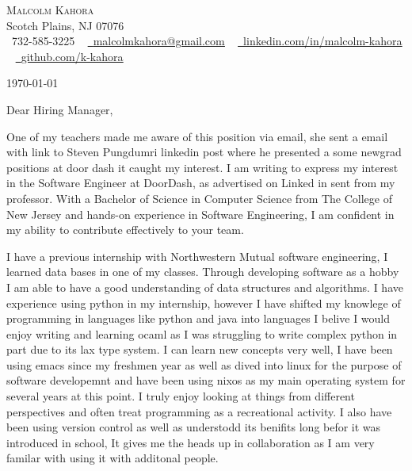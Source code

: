 \documentclass[letterpaper,11pt]{article}
\begin{document}
\begin{center}
    {\Huge \scshape Malcolm Kahora} \\ \vspace{1pt}
    Scotch Plains, NJ 07076 \\ \vspace{1pt}
    \small \raisebox{-0.1\height}\faPhone\ 732-585-3225 ~ \href{mailto:malcolmkahora@gmail.com}{\raisebox{-0.2\height}\faEnvelope\  \underline{malcolmkahora@gmail.com}} ~ 
    \href{https://linkedin.com/in/malcolm-kahora/}{\raisebox{-0.2\height}\faLinkedin\ \underline{linkedin.com/in/malcolm-kahora}}  ~
    \href{https://github.com/k-kahora}{\raisebox{-0.2\height}\faGithub\ \underline{github.com/k-kahora}}
    \vspace{-8pt}
\end{center}

\vspace{12pt}
\today


\vspace{12pt}
Dear Hiring Manager,

\vspace{12pt}
One of my teachers made me aware of this position via email, she sent a email with link to Steven Pungdumri linkedin post where he presented a some newgrad positions at door dash it caught my interest.  I am writing to express my interest in the Software Engineer at DoorDash, as advertised on Linked in sent from my professor. With a Bachelor of Science in Computer Science from The College of New Jersey and hands-on experience in Software Engineering, I am confident in my ability to contribute effectively to your team.

I have a previous internship with Northwestern Mutual software engineering, I learned data bases in one of my classes.  Through developing software as a hobby I am able to have a good understanding of data structures and algorithms.  I have experience using python in my internship, however I have shifted my knowlege of programming in languages like python and java into languages I belive I would enjoy writing and learning ocaml as I was struggling to write complex python in part due to its lax type system.
I can learn new concepts very well, I have been using emacs since my freshmen year as well as dived into linux for the purpose of software developemnt and have been using nixos as my main operating system for several years at this point.  I truly enjoy looking at things from different perspectives and often treat programming as a recreational activity.  I also have been using version control as well as understodd its benifits long befor it was introduced in school, It gives me the heads up in collaboration as I am very familar with using it with additonal people.
\end{document}
